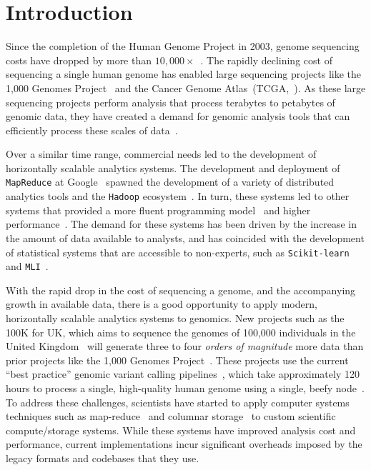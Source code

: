 \documentclass[masters]{ucbthesis}
\begin{document}
\section{Introduction}
\label{sec:introduction}

Since the completion of the Human Genome Project in 2003, genome sequencing costs have dropped
by more than $10,000\times$~\cite{nhgri}. The rapidly declining cost of sequencing a single human
genome has enabled large sequencing projects like the 1,000 Genomes Project~\cite{siva08} and
the Cancer Genome Atlas~(TCGA,~\cite{weinstein13}). As these large sequencing projects perform
analysis that process terabytes to petabytes of genomic data, they have created a demand
for genomic analysis tools that can efficiently process these scales of data~\cite{schadt10, stein10}.

Over a similar time range, commercial needs led to the development of horizontally scalable analytics
systems. The development and deployment of \texttt{MapReduce} at Google~\cite{dean04, dean08} spawned
the development of a variety of distributed analytics tools and the \texttt{Hadoop} ecosystem~\cite{hadoop}.
In turn, these systems led to other systems that provided a more fluent programming
model~\cite{yu08} and higher performance~\cite{zaharia10}. The demand for these systems has
been driven by the increase in the amount of data available to analysts, and has coincided with the
development of statistical systems that are accessible to non-experts, such as
\texttt{Scikit-learn}~\cite{pedregosa11} and \texttt{MLI}~\cite{sparks13}.

With the rapid drop in the cost of sequencing a genome, and the accompanying growth in available data,
there is a good opportunity to apply modern, horizontally scalable analytics systems to genomics. New
projects such as the 100K for UK, which aims to sequence the genomes of 100,000 individuals in the
United Kingdom~\cite{uk100k} will generate three to four \emph{orders of magnitude} more data than
prior projects like the 1,000 Genomes Project~\cite{siva08}. These projects use the current ``best
practice'' genomic variant calling pipelines~\cite{auwera13}, which take approximately 120 hours to
process a single, high-quality human genome using a single, beefy node~\cite{talwalkar14}. To address
these challenges, scientists have started to apply computer systems techniques such as
map-reduce~\cite{langmead09, mckenna10, schatz09} and columnar storage~\cite{fritz11} to custom
scientific compute/storage systems. While these systems have improved analysis cost and performance,
current implementations incur significant overheads imposed by the legacy formats and codebases that
they use.
\end{document}
